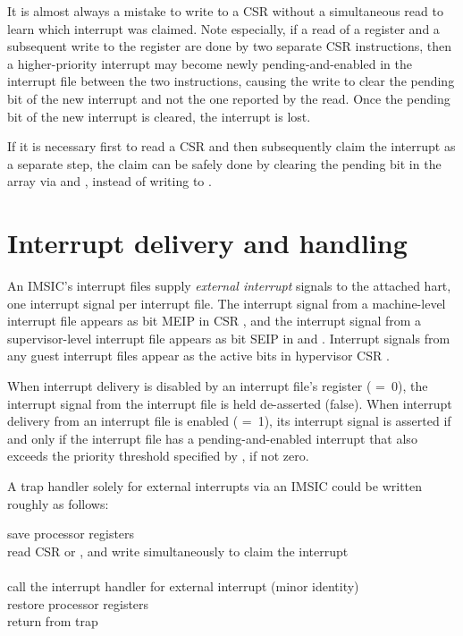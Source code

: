 \begin{commentary}
It is almost always a mistake to write to a  CSR without a
simultaneous read to learn which interrupt was claimed.
Note especially, if a read of a  register and a subsequent
write to the register are done by two separate CSR instructions, then
a higher-priority interrupt may become newly pending-and-enabled in the
interrupt file between the two instructions, causing the write to clear
the pending bit of the new interrupt and not the one reported by the
read.
Once the pending bit of the new interrupt is cleared, the interrupt is
lost.

If it is necessary first to read a  CSR and then subsequently
claim the interrupt as a separate step, the claim can be safely done by
clearing the pending bit in the  array
via  and ,
instead of writing to .
\end{commentary}

\section{Interrupt delivery and handling}

An IMSIC's interrupt files supply \emph{external interrupt} signals to
the attached hart, one interrupt signal per interrupt file.
The interrupt signal from a machine-level interrupt file appears as bit
MEIP in CSR , and the interrupt signal from a supervisor-level
interrupt file appears as bit SEIP in  and .
Interrupt signals from any guest interrupt files appear as the active
bits in hypervisor CSR .

When interrupt delivery is disabled by an interrupt file's
 register ( =~0), the interrupt signal from
the interrupt file is held de-asserted (false).
When interrupt delivery from an interrupt file is enabled
( =~1), its interrupt signal is asserted if and only
if the interrupt file has a pending-and-enabled interrupt that also
exceeds the priority threshold specified by , if not
zero.

A trap handler solely for external interrupts via an IMSIC could be
written roughly as follows:
\begin{displayLinesTable}
save processor registers \\
read CSR  or , and write simultaneously to
 claim the interrupt \\
 \\
call the interrupt handler for external interrupt  (minor identity) \\
restore processor registers \\
return from trap \\
\end{displayLinesTable}

